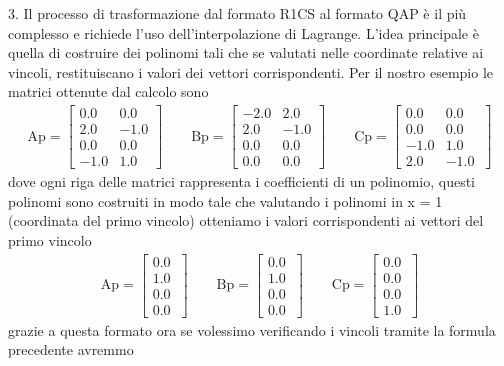 3. Il processo di trasformazione dal formato R1CS al formato QAP è il più complesso e richiede l'uso dell'interpolazione
di Lagrange. L'idea principale è quella di costruire dei polinomi tali che se valutati nelle coordinate relative ai
vincoli, restituiscano i valori dei vettori corrispondenti. Per il nostro esempio le matrici ottenute dal calcolo sono
\begin{gather*}
    \text{Ap} =
    \begin{bmatrix}
    0.0 & 0.0 \\
    2.0 & -1.0 \\
    0.0 & 0.0 \\
    -1.0 & 1.0 \
    \end{bmatrix}
    \qquad
    \text{Bp} =
    \begin{bmatrix}
    -2.0 & 2.0 \\
    2.0 & -1.0 \\
    0.0 & 0.0 \\
    0.0 & 0.0 \
    \end{bmatrix}
    \qquad
    \text{Cp} =
    \begin{bmatrix}
    0.0 & 0.0 \\
    0.0 & 0.0 \\
    -1.0 & 1.0 \\
    2.0 & -1.0 \
    \end{bmatrix}
\end{gather*}    
dove ogni riga delle matrici rappresenta i coefficienti di un polinomio, questi polinomi sono costruiti in modo tale
che valutando i polinomi in x = 1 (coordinata del primo vincolo) otteniamo i valori corrispondenti ai vettori del
primo vincolo
\begin{gather*}
    \text{Ap} =
    \begin{bmatrix}
    0.0 \\
    1.0 \\
    0.0 \\
    0.0 \
    \end{bmatrix}
    \qquad
    \text{Bp} =
    \begin{bmatrix}
    0.0 \\
    1.0 \\
    0.0 \\
    0.0 \
    \end{bmatrix}
    \qquad
    \text{Cp} =
    \begin{bmatrix}
    0.0 \\
    0.0 \\
    0.0 \\
    1.0 \
    \end{bmatrix}
\end{gather*}
grazie a questa formato ora se volessimo verificando i vincoli tramite la formula precedente avremmo


